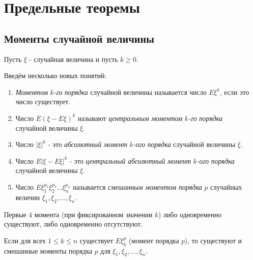\section{Предельные теоремы}

\subsection{Моменты случайной величины}

Пусть $\xi$ - случайная величина и пусть $k \ge 0$.

\begin{definition}
	Введём несколько новых понятий:
	\begin{enumerate}
		\item \textit{Моментом} $k$\textit{-го} \textit{порядка} случайной величины называется число $E\xi^k$, если это число существует.
		\item Число $E(\xi - E\xi)^k$ называют \textit{центральным моментом} $k$\textit{-го} \textit{порядка} случайной величины $\xi$.
		\item Число $|\xi|^k$ - это \textit{абсолютный момент} $k$\textit{-ого} \textit{порядка} случайной величины $\xi$.
		\item Число $E|\xi - E\xi|^k$ - это \textit{центральный абсолютный момент} $k$\textit{-ого} \textit{порядка} случайной величины $\xi$.
		\item Число $E \xi_{1}^{p_1}\xi_{2}^{p_2} \dots \xi_{n}^{p_n}$ называется \textit{смешанным моментом порядка} $p$ случайных величин $\xi_1, \xi_2, \dots, \xi_n$.
	\end{enumerate}
\end{definition}

\begin{remark}
	Первые 4 момента (при фиксированном значении $k$) либо одновременно существуют, либо одновременно отсутствуют.
\end{remark}

\begin{remark}
	Если для всех $1 \le k \le n$ существует $E \xi_k^p$ (момент порядка $p$), то существуют и смешанные моменты порядка $p$ для $\xi_1, \xi_2, \dots, \xi_n$.
\end{remark}


